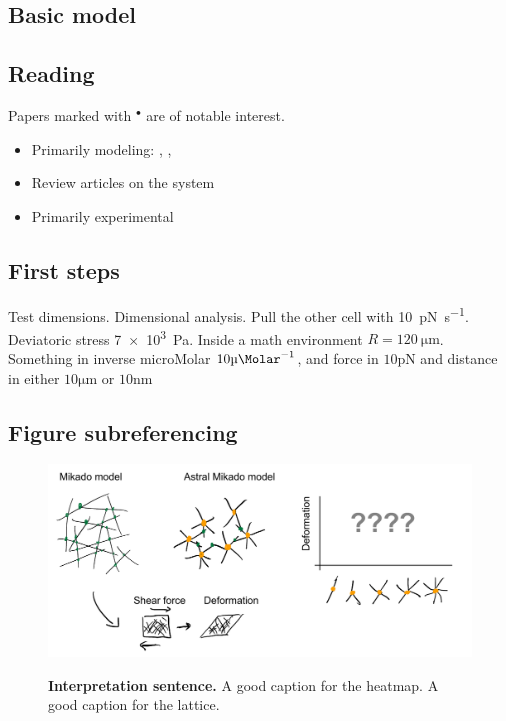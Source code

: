 \documentclass[onecolumn,11pt]{article}
\newcommand{\uM}{\si{\micro\Molar}}
\newcommand{\um}{\si{\micro\metre}}
\newcommand{\pN}{\si{\pico\newton}}
\newcommand{\nm}{\si{\nano\metre}}
\begin{document}
\subsection*{Basic model} 

\lipsum[2-5]  

\subsection*{Reading}
Papers marked with $^{\bullet}$ are of notable interest.
\begin{itemize}
\item Primarily modeling: \citet{Slaughter.2013}, \citet{Zhang.2019}, \citet{Ohadi.2019}
\item Review articles on the system
\item Primarily experimental
\end{itemize}


\subsection*{First steps} 

Test dimensions. 
Dimensional analysis. Pull the other cell with \SI{10}{\pico\newton\per\second}. Deviatoric stress \SI{7e3}{\pascal}. Inside a math environment $R=\SI{120}{\micro\meter}$. 
Something in inverse microMolar $10\uM^{-1}$, and force in $10\pN$ and distance in either $10\um$ or $10\nm$


\subsection{Figure subreferencing}

\begin{figure}[!ht]
        \centering
        \begin{subcaptiongroup}
                \includegraphics[width=174mm]{figures/figJeanJacket.pdf}
                \label{subfig:heatmap}
                \label{subfig:lattice}
                \end{subcaptiongroup}
        \captionsetup{subrefformat=parens}
        \caption{\label{fig:majorfig}\textbf{Interpretation sentence.}
                 A good caption for the heatmap. 
                 A good caption for the lattice. 
                }
\end{figure}
\end{document}

